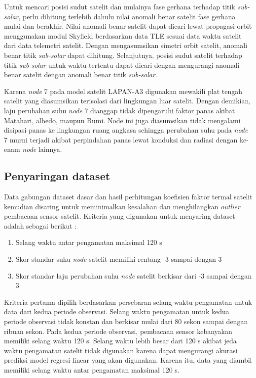 Untuk mencari posisi sudut satelit dan mulainya fase gerhana terhadap titik \textit{sub-solar}, perlu dihitung terlebih dahulu nilai anomali benar satelit fase gerhana mulai dan berakhir. Nilai anomali benar satelit dapat dicari lewat propagasi orbit menggunakan modul Skyfield berdasarkan data TLE sesuai data waktu satelit dari data telemetri satelit. Dengan mengasumsikan simetri orbit satelit, anomali benar titik \textit{sub-solar} dapat dihitung. Selanjutnya, posisi sudut satelit terhadap titik \textit{sub-solar} untuk waktu tertentu dapat dicari dengan mengurangi anomali benar satelit dengan anomali benar titik \textit{sub-solar}.

Karena \textit{node} 7 pada model satelit LAPAN-A3 digunakan mewakili plat
tengah satelit yang diasumsikan terisolasi dari lingkungan luar satelit. Dengan
demikian, laju perubahan suhu \textit{node} 7 dianggap tidak dipengaruhi faktor
panas akibat Matahari, albedo, maupun Bumi. Node ini juga diasumsikan tidak
mengalami disipasi panas ke lingkungan ruang angkasa sehingga perubahan suhu
pada \textit{node} 7 murni terjadi akibat perpindahan panas lewat konduksi dan
radiasi dengan ke-enam \textit{node} lainnya.

\subsection{Penyaringan dataset}

Data gabungan dataset dasar dan hasil perhitungan koefisien faktor termal
satelit kemudian disaring untuk meminimalkan kesalahan dan menghilangkan
\textit{outlier} pembacaan sensor satelit. Kriteria yang digunakan untuk
menyaring dataset adalah sebagai berikut :

\begin{enumerate}
\item Selang waktu antar pengamatan maksimal 120 s 
\item Skor standar suhu \textit{node} satelit memiliki rentang -3 sampai dengan 3
\item Skor standar laju perubahan suhu \textit{node} satelit berkisar dari -3 sampai dengan 3 
\end{enumerate}

Kriteria pertama dipilih berdasarkan persebaran selang waktu pengamatan untuk
data dari kedua periode observasi. Selang waktu pengamatan untuk kedua periode
observasi tidak konstan dan berkisar mulai dari 80 sekon sampai dengan ribuan
sekon. Pada kedua periode observasi, pembacaan sensor kebanyakan memiliki
selang waktu 120 s. Selang waktu lebih besar dari 120 s akibat jeda waktu
pengamatan satelit tidak digunakan karena dapat mengurangi akurasi prediksi
model regresi linear yang akan digunakan. Karena itu, data yang diambil
memiliki selang waktu antar pengamatan maksimal 120 s.

